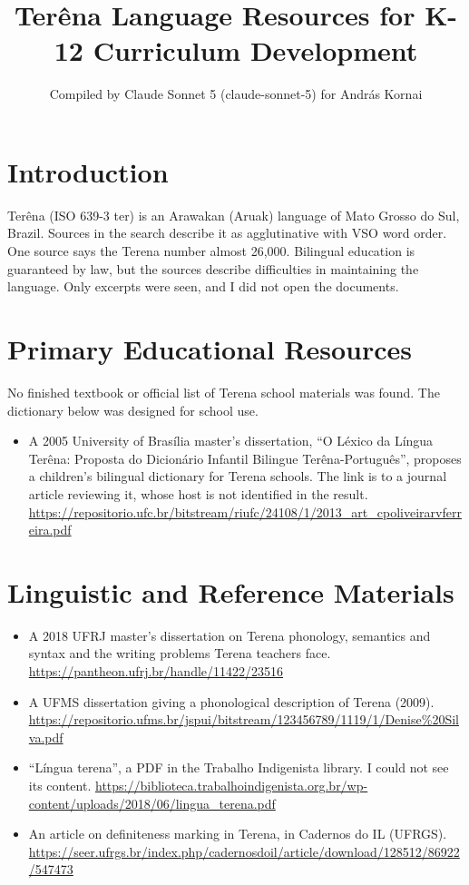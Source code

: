 \documentclass[12pt]{article}
\title{Ter\^ena Language Resources for K-12 Curriculum Development}
\author{Compiled by Claude Sonnet 5 (claude-sonnet-5) for Andr\'as Kornai}
\date{}
\begin{document}
\maketitle

\section{Introduction}
Ter\^ena (ISO 639-3 ter) is an Arawakan (Aruak) language of Mato Grosso do Sul, Brazil. Sources in the search describe it as agglutinative with VSO word order. One source says the Terena number almost 26,000. Bilingual education is guaranteed by law, but the sources describe difficulties in maintaining the language. Only excerpts were seen, and I did not open the documents.

\section{Primary Educational Resources}
No finished textbook or official list of Terena school materials was found. The dictionary below was designed for school use.
\begin{itemize}
\item A 2005 University of Bras\'ilia master's dissertation, ``O L\'exico da L\'ingua Ter\^ena: Proposta do Dicion\'ario Infantil Bilingue Ter\^ena-Portugu\^es'', proposes a children's bilingual dictionary for Terena schools. The link is to a journal article reviewing it, whose host is not identified in the result. \url{https://repositorio.ufc.br/bitstream/riufc/24108/1/2013_art_cpoliveirarvferreira.pdf}
\end{itemize}

\section{Linguistic and Reference Materials}
\begin{itemize}
\item A 2018 UFRJ master's dissertation on Terena phonology, semantics and syntax and the writing problems Terena teachers face. \url{https://pantheon.ufrj.br/handle/11422/23516}
\item A UFMS dissertation giving a phonological description of Terena (2009). \url{https://repositorio.ufms.br/jspui/bitstream/123456789/1119/1/Denise%20Silva.pdf}
\item ``L\'ingua terena'', a PDF in the Trabalho Indigenista library. I could not see its content. \url{https://biblioteca.trabalhoindigenista.org.br/wp-content/uploads/2018/06/lingua_terena.pdf}
\item An article on definiteness marking in Terena, in Cadernos do IL (UFRGS). \url{https://seer.ufrgs.br/index.php/cadernosdoil/article/download/128512/86922/547473}
\end{itemize}
\end{document}
